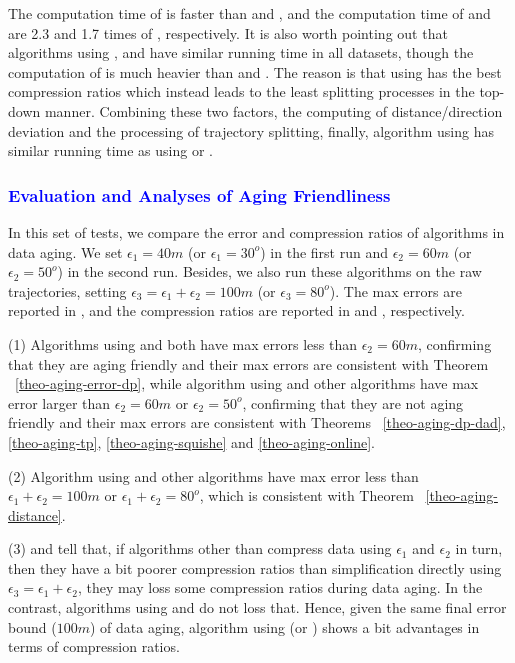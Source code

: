 The computation time of \dad is faster than \ped and \sed, and the computation time of \ped and \sed are 2.3 and 1.7 times of \dad, respectively.
{It is also worth pointing out that algorithms \dpa using \ped, \sed and \dad have similar running time in all datasets, though the computation of \ped is much heavier than \sed and \dad. The reason is that \dpa using \ped has the best compression ratios which instead leads to the least splitting processes in the top-down manner. Combining these two factors, \ie the computing of distance/direction deviation and the processing of trajectory splitting, finally, algorithm \dpa using \ped has similar running time as \dpa using \dad or \sed.}

\subsubsection{\textcolor{blue}{Evaluation and Analyses of Aging Friendliness}}

In this set of tests, we compare the error and compression ratios of algorithms in data aging. We set $\epsilon_1=40m$ (or $\epsilon_1=30^o$) in the first run and $\epsilon_2=60m$ (or $\epsilon_2=50^o$) in the second run. Besides, we also run these algorithms on the raw trajectories, setting $\epsilon_3=\epsilon_1 + \epsilon_2=100m$ (or $\epsilon_3=80^o$). The max errors are reported in , and the compression ratios are reported in  and , respectively.

\ni (1) Algorithms \dpa using \ped and \sed both have max errors less than $\epsilon_2 = 60m$, confirming that they are aging friendly and their max errors are consistent with Theorem ~\ref{theo-aging-error-dp}, while algorithm \dpa using \dad and other algorithms have max error larger than $\epsilon_2 = 60m$ or $\epsilon_2 = 50^o$, confirming that they are not aging friendly and their max errors are consistent with Theorems ~\ref{theo-aging-dp-dad}, \ref{theo-aging-tp}, \ref{theo-aging-squishe} and \ref{theo-aging-online}.

\ni (2) Algorithm \dpa using \dad and other algorithms have max error less than $\epsilon_1 + \epsilon_2 = 100m$ or $\epsilon_1 + \epsilon_2 = 80^o$, which is consistent with Theorem ~\ref{theo-aging-distance}.

\ni (3)  and  tell that, if algorithms other than \dpa compress data using $\epsilon_1$ and $\epsilon_2$ in turn, then they have a bit poorer compression ratios than simplification directly using $\epsilon_3=\epsilon_1 + \epsilon_2$, \ie they may loss some compression ratios during data aging. 
In the contrast, algorithms \dpa using \ped and \sed do not loss that. Hence, given the same final error bound (\eg $100m$) of data aging, algorithm \dpa using \ped (or \sed) shows a bit advantages in terms of compression ratios.   



